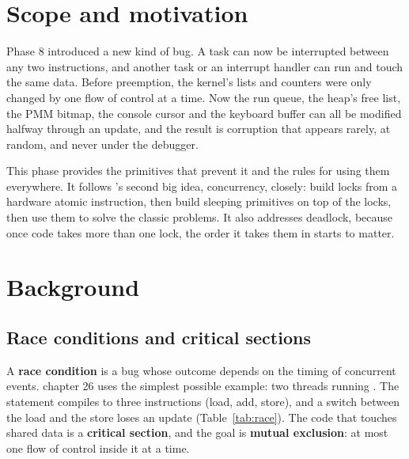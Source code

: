\documentclass[11pt,a4paper]{article}
\begin{document}


\section{Scope and motivation}

Phase 8 introduced a new kind of bug. A task can now be interrupted between any two instructions, and another task
or an interrupt handler can run and touch the same data. Before preemption, the kernel's lists and counters were
only changed by one flow of control at a time. Now the run queue, the heap's free list, the PMM bitmap, the console
cursor and the keyboard buffer can all be modified halfway through an update, and the result is corruption that
appears rarely, at random, and never under the debugger.

This phase provides the primitives that prevent it and the rules for using them everywhere. It follows \OSTEP's
second big idea, concurrency, closely: build locks from a hardware atomic instruction, then build sleeping primitives
on top of the locks, then use them to solve the classic problems. It also addresses deadlock,
because once code takes more than one lock, the order it takes them in starts to matter.

\section{Background}

\subsection{Race conditions and critical sections}

A \textbf{race condition} is a bug whose outcome depends on the timing of concurrent events. \OSTEP chapter 26 uses
the simplest possible example: two threads running . The statement compiles to three
instructions (load, add, store), and a switch between the load and the store loses an update (Table~\ref{tab:race}).
The code that touches shared data is a \textbf{critical section}, and the goal is \textbf{mutual exclusion}: at most
one flow of control inside it at a time.
\end{document}
